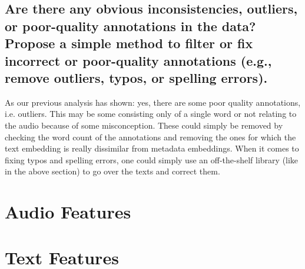 \documentclass{article}
\begin{document}
\subsection{Are there any obvious inconsistencies, outliers, or poor-quality annotations in the data? Propose a
simple method to filter or fix incorrect or poor-quality annotations (e.g., remove outliers, typos, or
spelling errors).}
\label{sec:Annotation Quality:c2}
As our previous analysis has shown: yes, there are some poor quality annotations, i.e. outliers. This may be some consisting only of a single word or not relating to the audio because of some misconception. 
These could simply be removed by checking the word count of the annotations and removing the ones for which the text embedding is really dissimilar from metadata embeddings.
When it comes to fixing typos and spelling errors, one could simply use an off-the-shelf library (like in the above section) to go over the texts and correct them.


\pagebreak

\section{Audio Features}
\label{sec:Audio Features}

\subsection{}
\label{sec:Audio Features:a}

\subsection{}
\label{sec:Audio Features:b}

\subsection{}
\label{sec:Audio Features:c}




\section{Text Features}
\label{sec:Text Features}

\subsection{}
\label{sec:Text Features:a}

\subsection{}
\label{sec:Text Features:b}
\end{document}
